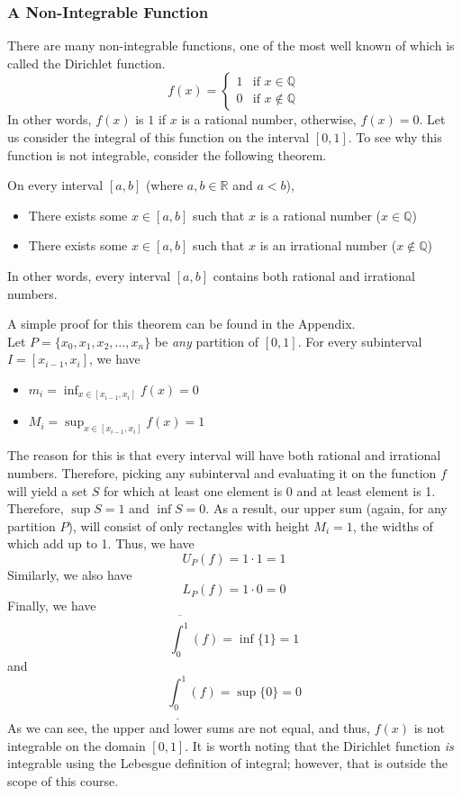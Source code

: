 \documentclass[11pt]{article}
\def\Q{{\mathbb Q}}
\def\R{{\mathbb R}}
\newenvironment{theorem}[1][]{\begin{tcolorbox}[colframe=_blue,colback=_blue2,title=Theorem. \ifthenelse{\isempty{#1}}{}{(#1)}
]}{\end{tcolorbox}}
\newcommand{\emptyline}[0]{\\\hfill$~$\\}
\begin{document}
\subsubsection{A Non-Integrable Function}
There are many non-integrable functions, one of the most well known of which is called the Dirichlet function.
$$
    f(x)=\begin{cases}1&\text{if $x\in\Q$}\\0&\text{if $x\notin\Q$}\end{cases}
$$
In other words, $f(x)$ is $1$ if $x$ is a rational number, otherwise, $f(x)=0$. Let us consider the integral of this function on the interval $[0,1]$. To see why this function is not integrable, consider the following theorem.
\begin{theorem}[``Rational Number Theorem'']
    On every interval $[a,b]$ (where $a,b\in\R$ and $a<b$),
    \begin{itemize}
        \item There exists some $x\in[a,b]$ such that $x$ is a rational number ($x\in \Q$)
        \item There exists some $x\in[a,b]$ such that $x$ is an irrational number ($x\notin \Q$)
    \end{itemize}
    In other words, every interval $[a,b]$ contains both rational and irrational numbers.
\end{theorem}
A simple proof for this theorem can be found in the Appendix.\emptyline
Let $P=\{x_0,x_1,x_2,\dots,x_n\}$ be \textit{any} partition of $[0,1]$. For every subinterval $I=[x_{i-1},x_i]$, we have
\begin{itemize}
    \item $m_i=\displaystyle\inf_{x\in[x_{i-1},x_i]}f(x)=0$
    \item $M_i=\displaystyle\sup_{x\in[x_{i-1},x_i]}f(x)=1$
\end{itemize}
The reason for this is that every interval will have both rational and irrational numbers. Therefore, picking any subinterval and evaluating it on the function $f$ will yield a set $S$ for which at least one element is 0 and at least element is 1. Therefore, $\sup S=1$ and $\inf S=0$. As a result, our upper sum (again, for any partition $P$), will consist of only rectangles with height $M_i=1$, the widths of which add up to 1. Thus, we have
$$
    U_P(f)=1\cdot 1=1
$$
Similarly, we also have
$$
    L_P(f)=1\cdot 0=0
$$
Finally, we have
$$
    \overline{\int_{0}^{1}}(f)=\inf\{1\}=1
$$
and
$$
    \underline{\int_{0}^{1}}(f)=\sup\{0\}=0
$$
As we can see, the upper and lower sums are not equal, and thus, $f(x)$ is not integrable on the domain $[0,1]$. It is worth noting that the Dirichlet function \textit{is} integrable using the Lebesgue definition of integral; however, that is outside the scope of this course.
\end{document}
